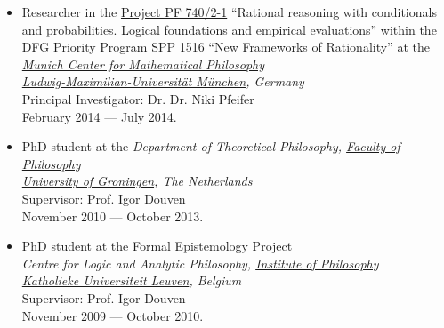 \documentclass[a4paper,12pt]{article}
\begin{document}
\begin{small}
\begin{itemize}
\item Researcher in the \href{http://www.pfeifer-research.de/spp.html}{Project PF 740/2-1} ``Rational
reasoning with conditionals and probabilities. Logical foundations and empirical evaluations''
within the DFG Priority Program SPP 1516 ``New Frameworks of Rationality'' at the \emph{\href{http://www.mcmp.philosophie.uni-muenchen.de/}{Munich Center for Mathematical Philosophy}}\\
\emph{\href{http://www.en.uni-muenchen.de/}{Ludwig-Maximilian-Universität München}, Germany}\\
  Principal Investigator: Dr. Dr. Niki Pfeifer\\
  February 2014 --- July 2014.

  \item PhD student at
    the %
    \emph{Department of Theoretical Philosophy, \href{http://www.rug.nl/filosofie/}{Faculty of Philosophy}\\
      \href{http://www.rug.nl}{University of Groningen}, The Netherlands}\\
    Supervisor: Prof. Igor Douven\\
    November 2010 --- October 2013.


  \item PhD student at the  \href{http://formalphilosophy.org/}{Formal Epistemology Project}\\
    \emph{Centre for Logic and Analytic Philosophy, \href{http://hiw.kuleuven.be/eng/}{Institute of Philosophy}\\
      \href{http://www.kuleuven.be/english}{Katholieke Universiteit Leuven}, Belgium}\\
    Supervisor: Prof. Igor Douven\\
    November 2009 --- October 2010.

  \end{itemize}




\end{small}
\end{document}
